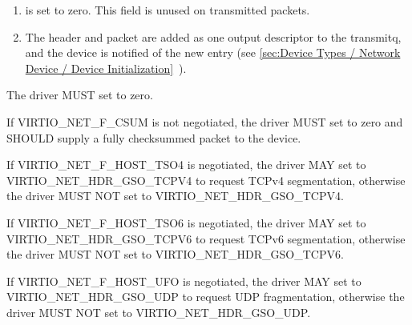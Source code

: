 \begin{enumerate}
\begin{itemize}
  \begin{note}
  Some devices benefit from knowledge of the exact header length.
  \end{note}

  \item {} is the maximum size of each packet beyond that
    header (ie. MSS).

  \item If the driver negotiated the VIRTIO_NET_F_HOST_ECN feature,
    the VIRTIO_NET_HDR_GSO_ECN bit in 
    indicates that the TCP packet has the ECN bit set\footnote{This case is not handled by some older hardware, so is called out
specifically in the protocol.}.
   \end{itemize}

\item {} is set to zero.  This field is unused on transmitted packets.

\item The header and packet are added as one output descriptor to the
  transmitq, and the device is notified of the new entry
  (see \ref{sec:Device Types / Network Device / Device Initialization}~).
\end{enumerate}


The driver MUST set  to zero.

If VIRTIO_NET_F_CSUM is not negotiated, the driver MUST set
 to zero and SHOULD supply a fully checksummed
packet to the device.

If VIRTIO_NET_F_HOST_TSO4 is negotiated, the driver MAY set
 to VIRTIO_NET_HDR_GSO_TCPV4 to request TCPv4
segmentation, otherwise the driver MUST NOT set
 to VIRTIO_NET_HDR_GSO_TCPV4.

If VIRTIO_NET_F_HOST_TSO6 is negotiated, the driver MAY set
 to VIRTIO_NET_HDR_GSO_TCPV6 to request TCPv6
segmentation, otherwise the driver MUST NOT set
 to VIRTIO_NET_HDR_GSO_TCPV6.

If VIRTIO_NET_F_HOST_UFO is negotiated, the driver MAY set
 to VIRTIO_NET_HDR_GSO_UDP to request UDP
fragmentation, otherwise the driver MUST NOT set
 to VIRTIO_NET_HDR_GSO_UDP.

